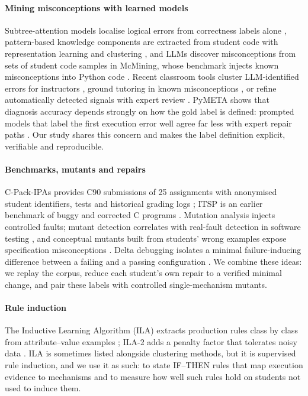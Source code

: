 \documentclass[a4paper,preprint,12pt,authoryear]{elsarticle}
\begin{document}
\paragraph{Mining misconceptions with learned models}
Subtree-attention models localise logical errors from correctness labels alone \citep{hoq2025sann}, pattern-based knowledge components are extracted from student code with representation learning and clustering \citep{edm2026patternkc}, and LLMs discover misconceptions from sets of student code samples in McMining, whose benchmark injects known misconceptions into Python code \citep{alhossami2026mcmining}. Recent classroom tools cluster LLM-identified errors for instructors \citep{sigcse2026realtime}, ground tutoring in known misconceptions \citep{sigcse2026tutor}, or refine automatically detected signals with expert review \citep{aruleba2026ukicer}. PyMETA shows that diagnosis accuracy depends strongly on how the gold label is defined: prompted models that label the first execution error well agree far less with expert repair paths \citep{li2026pymeta}. Our study shares this concern and makes the label definition explicit, verifiable and reproducible.

\paragraph{Benchmarks, mutants and repairs}
C-Pack-IPAs provides C90 submissions of 25 assignments with anonymised student identifiers, tests and historical grading logs \citep{orvalho2024cpack}; ITSP is an earlier benchmark of buggy and corrected C programs \citep{yi2017itsp}. Mutation analysis injects controlled faults; mutant detection correlates with real-fault detection in software testing \citep{just2014mutants}, and conceptual mutants built from students' wrong examples expose specification misconceptions \citep{prasad2024conceptual}. Delta debugging isolates a minimal failure-inducing difference between a failing and a passing configuration \citep{zeller2002ddmin}. We combine these ideas: we replay the corpus, reduce each student's own repair to a verified minimal change, and pair these labels with controlled single-mechanism mutants.

\paragraph{Rule induction}
The Inductive Learning Algorithm (ILA) extracts production rules class by class from attribute--value examples \citep{tolun1998ila}; ILA-2 adds a penalty factor that tolerates noisy data \citep{tolun1999ila2}. ILA is sometimes listed alongside clustering methods, but it is supervised rule induction, and we use it as such: to state IF--THEN rules that map execution evidence to mechanisms and to measure how well such rules hold on students not used to induce them.
\end{document}
